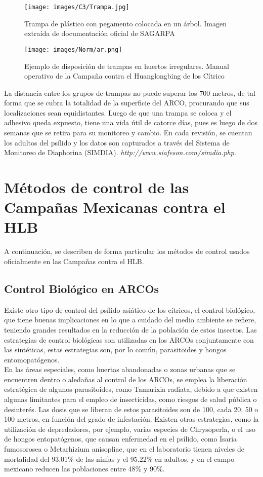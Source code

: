 \begin{figure}[H]
\centering
\texttt{[image: images/C3/Trampa.jpg]}
\caption{Trampa de plástico con pegamento colocada en un árbol. Imagen extraída de documentación oficial de SAGARPA}
\end{figure}


\begin{figure}[H]
\centering
\texttt{[image: images/Norm/ar.png]}
\caption{Ejemplo de disposición de trampas en huertos irregulares. Manual operativo de la Campaña contra el Huanglongbing de los Cítrico}
\end{figure}

La distancia entre los grupos de trampas no puede superar los 700 metros, de tal forma que se cubra la totalidad de la superficie del ARCO, procurando que sus localizaciones sean equidistantes. Luego de que una trampa se coloca y el adhesivo queda expuesto, tiene una vida útil de catorce días, pues es luego de dos semanas que se retira para su monitoreo y cambio. En cada revisión, se cuentan los adultos del psílido y los datos son capturados a través del Sistema de Monitoreo de Diaphorina (SIMDIA). \textit{http://www.siafeson.com/simdia.php}.\\

\section{Métodos de control de las Campañas Mexicanas contra el HLB}

A continuación, se describen de forma particular los métodos de control usados oficialmente en las Campañas contra el HLB.

\subsection{Control Biológico en ARCOs}%
Existe otro tipo de control del psílido asiático de los cítricos, el control biológico, que tiene buenas implicaciones en lo que a cuidado del medio ambiente se refiere, teniendo grandes resultados en la reducción de la población de estos insectos. Las estrategias de control biológicas son utilizadas en los ARCOs conjuntamente con las sintéticas, estas estrategias son, por lo común, parasitoides y hongos entomopatógenos.\\
En las áreas especiales, como huertas abandonadas o zonas urbanas que se encuentren dentro o aledañas al control de los ARCOs, se emplea la liberación estratégica de algunos parasitoides, como Tamarixia radiata, debido a que existen algunas limitantes para el empleo de insecticidas, como riesgos de salud pública o desinterés. Las dosis que se liberan de estos parasitoides son de 100, cada 20, 50 o 100 metros, en función del grado de infestación. Existen otras estrategias, como la utilización de depredadores, por ejemplo, varias especies de Chrysoperla, o el uso de hongos entopatógenos, que causan enfermedad en el psílido, como Isaria fumosorosea o Metarhizium anisopliae, que en el laboratorio tienen niveles de mortalidad del 93.01\% de las ninfas y el 95.22\% en adultos, y en el campo mexicano reducen las poblaciones entre 48\% y 90\%.

